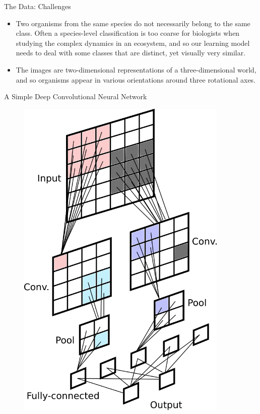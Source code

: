 \documentclass[final,hyperref={pdfpagelabels=false}]{beamer}
\begin{document}
\begin{frame}
\begin{columns}[T]
  	\begin{column}{.32\textwidth}
      \begin{block}{The Data: Challenges}
        \begin{itemize}
          \item Two organisms from the same species do not necessarily belong to the same class.  Often a species-level classification
            is too coarse for biologists when studying the complex dynamics in an ecosystem, and so our learning model
            needs to deal with some classes that are distinct, yet visually very similar.
          \item The images are two-dimensional representations of a three-dimensional world, and so organisms appear in various
            orientations around three rotational axes.
        \end{itemize}
      \end{block}

      \begin{block}{A Simple Deep Convolutional Neural Network}
        \begin{figure}
          \includegraphics[width=0.9\textwidth]{images/svg/convnet.png}
        \end{figure}
      \end{block}
    \end{column}


\end{columns}
\end{frame}
\end{document}
